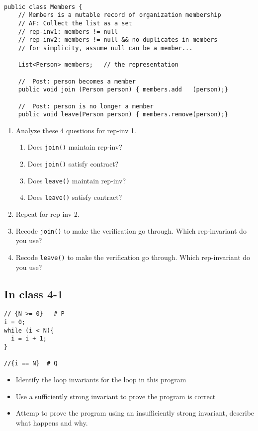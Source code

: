 \documentclass[11pt]{article}
\begin{document}
\begin{verbatim}

public class Members {
    // Members is a mutable record of organization membership
    // AF: Collect the list as a set
    // rep-inv1: members != null
    // rep-inv2: members != null && no duplicates in members
    // for simplicity, assume null can be a member...

    List<Person> members;   // the representation

    //  Post: person becomes a member
    public void join (Person person) { members.add   (person);}

    //  Post: person is no longer a member
    public void leave(Person person) { members.remove(person);}

\end{verbatim}


\begin{enumerate}
\item Analyze these 4 questions for rep-inv 1.
\begin{enumerate}
\item Does \texttt{join()} maintain rep-inv?
\item Does \texttt{join()} satisfy contract?
\item Does \texttt{leave()} maintain rep-inv?
\item Does \texttt{leave()} satisfy contract?
\end{enumerate}
\item Repeat for rep-inv 2.
\item Recode \texttt{join()} to make the verification go through. Which rep-invariant do you use?
\item Recode \texttt{leave()} to make the verification go through. Which rep-invariant do you use?
\end{enumerate}

\subsection{In class 4-1}
\label{sec:org6f6e901}
\begin{verbatim}
// {N >= 0}   # P  
i = 0;
while (i < N){
  i = i + 1;
}

//{i == N}  # Q
\end{verbatim}

\begin{itemize}
\item Identify the loop invariants for the loop in this program
\item Use a sufficiently strong invariant to prove the program is correct
\item Attemp to prove the program using an insufficiently strong invariant, describe what happens and why.
\end{itemize}
\end{document}
